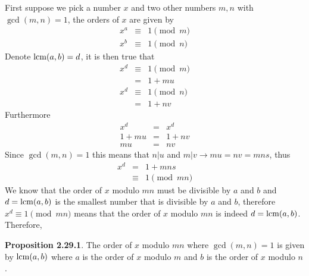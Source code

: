 \documentclass[aps,preprint,preprintnumbers,nofootinbib,showpacs,prd]{revtex4-1}
\newcommand{\nbea}{\begin{eqnarray*}}
\newcommand{\neea}{\end{eqnarray*}}
\begin{document}
First suppose we pick a number $x$ and two other numbers $m,n$ with $\gcd(m,n) = 1$, the orders of $x$ are given by
%
\nbea
x^a & \equiv & 1 \pmod{m} \\
x^b & \equiv & 1 \pmod{n}
\neea
%
Denote ${\rm lcm}(a,b) = d$, it is then true that
%
\nbea
x^d &\equiv & 1 \pmod{m} \\
& = & 1 + mu\\
x^d & \equiv & 1 \pmod{n} \\
& = & 1 + nv
\neea
%
Furthermore
%
\nbea
x^d & = & x^d \\
1 + mu & = & 1 +nv \\
mu & = & nv
\neea
%
Since $\gcd(m,n)=1$ this means that $n|u$ and $m|v \to mu=nv = mns$, thus
%
\nbea
x^d & = & 1 + mn s \\
& \equiv & 1 \pmod{mn}
\neea
%
We know that the order of $x$ modulo $mn$ must be divisible by $a$ and $b$ and $d = {\rm lcm}(a,b)$ is the smallest number that is divisible by $a$ and $b$, therefore $x^d \equiv 1 \pmod{mn}$ means that the order of $x$ modulo $mn$ is indeed $d = {\rm lcm}(a,b)$. Therefore,

{\bf Proposition 2.29.1}. The order of $x$ modulo $mn$ where $\gcd(m,n) = 1$ is given by ${\rm lcm}(a,b)$ where $a$ is the order of $x$ modulo $m$ and $b$ is the order of $x$ modulo $n$.
\end{document}
